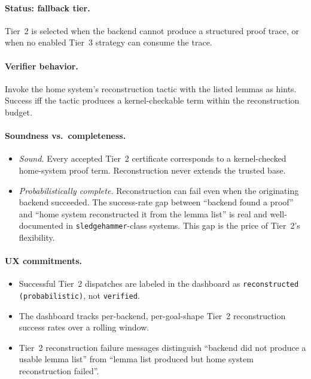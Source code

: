 \documentclass[11pt,letterpaper]{article}
\theoremstyle{definition}
\theoremstyle{remark}
\begin{document}
\paragraph{Status: fallback tier.} Tier~2 is selected when the backend
cannot produce a structured proof trace, or when no enabled Tier~3
strategy can consume the trace.

\paragraph{Verifier behavior.} Invoke the home system's reconstruction
tactic with the listed lemmas as hints. Success iff the tactic produces
a kernel-checkable term within the reconstruction budget.

\paragraph{Soundness vs.\ completeness.}

\begin{itemize}[leftmargin=2em]
  \item \emph{Sound.} Every accepted Tier~2 certificate corresponds to a
        kernel-checked home-system proof term. Reconstruction never
        extends the trusted base.
  \item \emph{Probabilistically complete.} Reconstruction can fail even
        when the originating backend succeeded. The success-rate gap
        between ``backend found a proof'' and ``home system reconstructed
        it from the lemma list'' is real and well-documented in
        \texttt{sledgehammer}-class systems. This gap is the price of
        Tier~2's flexibility.
\end{itemize}

\paragraph{UX commitments.}

\begin{itemize}[leftmargin=2em]
  \item Successful Tier~2 dispatches are labeled in the dashboard as
        \texttt{reconstructed (probabilistic)}, not \texttt{verified}.
  \item The dashboard tracks per-backend, per-goal-shape Tier~2
        reconstruction success rates over a rolling window.
  \item Tier~2 reconstruction failure messages distinguish ``backend
        did not produce a usable lemma list'' from ``lemma list
        produced but home system reconstruction failed''.
\end{itemize}
\end{document}

